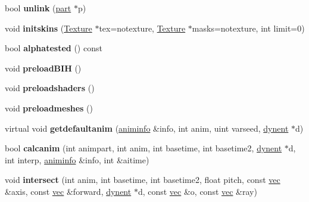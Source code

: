 \begin{DoxyCompactItemize}
bool {\bfseries unlink} (\hyperlink{structanimmodel_1_1part}{part} $\ast$p)
\item 
\mbox{\label{structanimmodel_1_1part_abe5c950d6a2b9fe8ac441ff9d2d78706}} 
void {\bfseries initskins} (\hyperlink{struct_texture}{Texture} $\ast$tex=notexture, \hyperlink{struct_texture}{Texture} $\ast$masks=notexture, int limit=0)
\item 
\mbox{\label{structanimmodel_1_1part_a74bd144ad69f6b213cea9ab3f92dccc9}} 
bool {\bfseries alphatested} () const
\item 
\mbox{\label{structanimmodel_1_1part_aa335b606509e62ea1afbc5910df69695}} 
void {\bfseries preload\+B\+IH} ()
\item 
\mbox{\label{structanimmodel_1_1part_a3a54999dd3f74d35cd0d62d15ef4a424}} 
void {\bfseries preloadshaders} ()
\item 
\mbox{\label{structanimmodel_1_1part_ac9bc14a8e9b7859dddd47137ac79a73d}} 
void {\bfseries preloadmeshes} ()
\item 
\mbox{\label{structanimmodel_1_1part_ad393d1a0986ff8940a7cb25029430b16}} 
virtual void {\bfseries getdefaultanim} (\hyperlink{structaniminfo}{animinfo} \&info, int anim, uint varseed, \hyperlink{structdynent}{dynent} $\ast$d)
\item 
\mbox{\label{structanimmodel_1_1part_a6f8e474736f702b4838b5a72e39c8b46}} 
bool {\bfseries calcanim} (int animpart, int anim, int basetime, int basetime2, \hyperlink{structdynent}{dynent} $\ast$d, int interp, \hyperlink{structaniminfo}{animinfo} \&info, int \&aitime)
\item 
\mbox{\label{structanimmodel_1_1part_a8c0dad5cf6935b9db75183f846bf7b92}} 
void {\bfseries intersect} (int anim, int basetime, int basetime2, float pitch, const \hyperlink{structvec}{vec} \&axis, const \hyperlink{structvec}{vec} \&forward, \hyperlink{structdynent}{dynent} $\ast$d, const \hyperlink{structvec}{vec} \&o, const \hyperlink{structvec}{vec} \&ray)
\item 
\mbox{\label{structanimmodel_1_1part_a758047e6ee6b11b151f7d55a1ab18e6d}} 

\end{DoxyCompactItemize}
